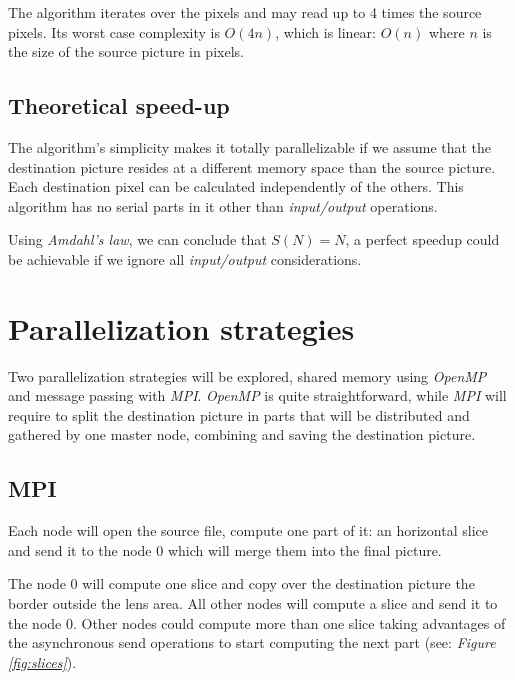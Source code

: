 \documentclass[10pt,a4paper]{article}
\begin{document}
The algorithm iterates over the pixels and may read up to 4 times the source
pixels. Its worst case complexity is $O(4n)$, which is linear: $O(n)$ where
$n$ is the size of the source picture in pixels.

\subsection{Theoretical speed-up}

The algorithm's simplicity makes it totally parallelizable if we assume that
the destination picture resides at a different memory space than the source
picture. Each destination pixel can be calculated independently of the others.
This algorithm has no serial parts in it other than \emph{input/output}
operations.

Using \emph{Amdahl's law}, we can conclude that $S(N) = N$, a perfect speedup
could be achievable if we ignore all \emph{input/output} considerations.

\section{Parallelization strategies}

Two parallelization strategies will be explored, shared memory using
\emph{OpenMP} and message passing with \emph{MPI}. \emph{OpenMP} is quite
straightforward, while \emph{MPI} will require to split the destination picture
in parts that will be distributed and gathered by one master node, combining
and saving the destination picture.

\subsection{MPI}
Each node will open the source file, compute one part of it: an horizontal
slice and send it to the node $0$ which will merge them into the final picture.

The node $0$ will compute one slice and copy over the destination picture the
border outside the lens area. All other nodes will compute a slice and send it
to the node $0$. Other nodes could compute more than one slice taking
advantages of the asynchronous send operations to start computing the next
part (see: \emph{Figure \ref{fig:slices}}).
\end{document}
